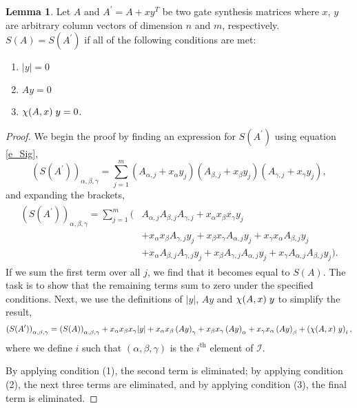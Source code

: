 \documentclass{article}
\theoremstyle{definition}
\theoremstyle{problem}
\theoremstyle{lemma}
\newtheorem{lemma}{Lemma}[section]
\begin{document}
		\theoremstyle{lemma}
		\begin{lemma}{}
			Let $A$ and $A^\prime = A + xy^T$ be two gate synthesis matrices where $x$, $y$ are arbitrary column vectors of dimension $n$ and $m$, respectively. $S(A) = S(A^\prime)$ if all of the following conditions are met:
			\begin{enumerate}
				\item $|y| = 0$
				\item $Ay = 0$
				\item $\chi(A,x)\hspace{1mm}y = 0$.
			\end{enumerate}
		\end{lemma}
		\begin{proof}
			We begin the proof by finding an expression for $S(A^\prime)$ using equation \ref{e_Sig},
			\begin{equation}
			\left(S(A^\prime)\right)_{\alpha,\beta,\gamma} = \sum_{j=1}^{m}\left(A_{\alpha,j}+x_\alpha y_j\right)\left(A_{\beta,j}+x_\beta y_j\right)\left(A_{\gamma,j}+x_\gamma y_j\right),
			\end{equation}
			and expanding the brackets,
			\begin{align}
			\label{e_working1}
			\begin{split}
			\left(S(A^\prime)\right)_{\alpha,\beta,\gamma} = \sum_{j=1}^{m}(&A_{\alpha,j}A_{\beta,j}A_{\gamma,j} + x_\alpha x_\beta x_\gamma y_j  \\			
			&+ x_\alpha x_\beta A_{\gamma,j} y_j + x_\beta x_\gamma A_{\alpha,j} y_j + x_\gamma x_\alpha A_{\beta,j} y_j \\
			&+ x_\alpha A_{\beta,j} A_{\gamma,j} y_j + x_\beta A_{\gamma,j} A_{\alpha,j} y_j + x_\gamma A_{\alpha,j} A_{\beta,j} y_j).
			\end{split}
			\end{align}
			If we sum the first term over all $j$, we find that it becomes equal to $S(A)$. The task is to show that the remaining terms sum to zero under the specified conditions. Next, we use the definitions of $|y|$, $Ay$ and $\chi(A,x)\hspace{1mm}y$ to simplify the result,
			\begin{equation}
			\left(S(A^\prime)\right)_{\alpha,\beta,\gamma} = \left(S(A)\right)_{\alpha,\beta,\gamma} + x_\alpha x_\beta x_\gamma |y| + x_\alpha x_\beta \left(Ay\right)_\gamma + x_\beta x_\gamma \left(Ay\right)_\alpha + x_\gamma x_\alpha \left(Ay\right)_\beta + \left(\chi(A,x)\hspace{1mm}y\right)_i,
			\end{equation}
			where we define $i$ such that $(\alpha,\beta,\gamma)$ is the $i^\text{th}$ element of $\mathcal{I}$.
			
			By applying condition (1), the second term is eliminated; by applying condition (2), the next three terms are eliminated, and by applying condition (3), the final term is eliminated.
		\end{proof}
	
\end{document}
